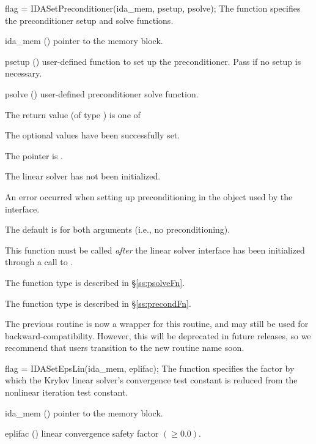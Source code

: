 {
{
  flag = IDASetPreconditioner(ida\_mem, psetup, psolve);
}
{
  The function  specifies the preconditioner
  setup and solve functions.
}
{
  \begin{args}
  \item[ida\_mem] ()
    pointer to the {\ida} memory block.
  \item[psetup] ()
    user-defined function to set up the preconditioner.  Pass  if no
    setup is necessary.
  \item[psolve] ()
    user-defined preconditioner solve function.
  \end{args}
}
{
  The return value  (of type ) is one of
  \begin{args}
  \item[\Id{IDALS\_SUCCESS}]
    The optional values have been successfully set.
  \item[\Id{IDALS\_MEM\_NULL}]
    The  pointer is .
  \item[\Id{IDALS\_LMEM\_NULL}]
    The {\idals} linear solver has not been initialized.
  \item[\Id{IDALS\_SUNLS\_FAIL}]
    An error occurred when setting up preconditioning in the
    {\sunlinsol} object used by the {\idals} interface.
  \end{args}
}
{
  The default is  for both arguments (i.e., no
  preconditioning).

  This function must be called \emph{after} the {\idals} linear solver
  interface has been initialized through a call to .

  The function type  is described in \S\ref{ss:psolveFn}.

  The function type  is described in \S\ref{ss:precondFn}.

  The previous routine  is now a wrapper
  for this routine, and may still be used for backward-compatibility.
  However, this will be deprecated in future releases, so we recommend
  that users transition to the new routine name soon.
}
{
  flag = IDASetEpsLin(ida\_mem, eplifac);
}
{
  The function  specifies the factor by
  which the Krylov linear solver's convergence test constant is
  reduced from the nonlinear iteration test constant.
}
{
  \begin{args}
  \item[ida\_mem] ()
    pointer to the {\ida} memory block.
  \item[eplifac] () linear convergence safety factor $(
    \geq 0.0)$.


\end{args}}}

